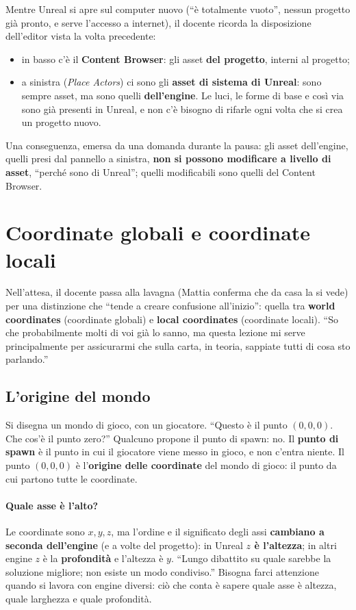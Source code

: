Mentre Unreal si apre sul computer nuovo (``è totalmente vuoto'', nessun
progetto già pronto, e serve l'accesso a internet), il docente ricorda la
disposizione dell'editor vista la volta precedente:
\begin{itemize}
  \item in basso c'è il \textbf{Content Browser}: gli asset \textbf{del
        progetto}, interni al progetto;
  \item a sinistra (\emph{Place Actors}) ci sono gli \textbf{asset di sistema
        di Unreal}: sono sempre asset, ma sono quelli \textbf{dell'engine}. Le
        luci, le forme di base e così via sono già presenti in Unreal, e non c'è
        bisogno di rifarle ogni volta che si crea un progetto nuovo.
\end{itemize}
Una conseguenza, emersa da una domanda durante la pausa: gli asset
dell'engine, quelli presi dal pannello a sinistra, \textbf{non si possono
modificare a livello di asset}, ``perché sono di Unreal''; quelli modificabili
sono quelli del Content Browser.

\section{Coordinate globali e coordinate locali}
\label{gd11:sec:coordinate}

Nell'attesa, il docente passa alla lavagna (Mattia conferma che da casa la si
vede) per una distinzione che ``tende a creare confusione all'inizio'': quella
tra \textbf{world coordinates} (coordinate globali) e \textbf{local
coordinates} (coordinate locali). ``So che probabilmente molti di voi già lo
sanno, ma questa lezione mi serve principalmente per assicurarmi che sulla
carta, in teoria, sappiate tutti di cosa sto parlando.''

\subsection{L'origine del mondo}

Si disegna un mondo di gioco, con un giocatore. ``Questo è il punto
$(0,0,0)$. Che cos'è il punto zero?'' Qualcuno propone il punto di spawn: no.
Il \textbf{punto di spawn} è il punto in cui il giocatore viene messo in gioco,
e non c'entra niente. Il punto $(0,0,0)$ è l'\textbf{origine delle coordinate}
del mondo di gioco: il punto da cui partono tutte le coordinate.

\paragraph{Quale asse è l'alto?} Le coordinate sono $x, y, z$, ma l'ordine e il
significato degli assi \textbf{cambiano a seconda dell'engine} (e a volte del
progetto): in Unreal \textbf{$z$ è l'altezza}; in altri engine $z$ è la
\textbf{profondità} e l'altezza è $y$. ``Lungo dibattito su quale sarebbe la
soluzione migliore; non esiste un modo condiviso.'' Bisogna farci attenzione
quando si lavora con engine diversi: ciò che conta è sapere quale asse è
altezza, quale larghezza e quale profondità.

